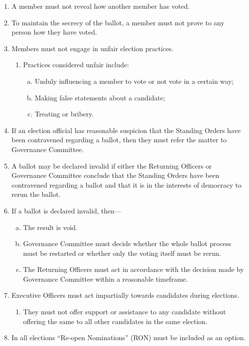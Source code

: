 \documentclass[12pt]{article}
\begin{document}
\begin{enumerate}
\begin{enumerate}
    \end{enumerate}
    \item A member must not reveal how another member has voted.
    \item To maintain the secrecy of the ballot, a member must not prove to any person how they have voted.
    \item Members must not engage in unfair election practices.
    \begin{enumerate}
        \item Practices considered unfair include:
        \begin{enumerate}[(a)]
            \item Unduly influencing a member to vote or not vote in a certain way;
            \item Making false statements about a candidate;
            \item Treating or bribery.
        \end{enumerate}
    \end{enumerate}
    \item If an election official has reasonable suspicion that the Standing Orders have been contravened regarding a ballot, then they must refer the matter to Governance Committee.
    \item A ballot may be declared invalid if either the Returning Officers or Governance Committee conclude that the Standing Orders have been contravened regarding a ballot and that it is in the interests of democracy to rerun the ballot.
    \item If a ballot is declared invalid, then—
    \begin{enumerate}[(a)]
        \item The result is void.
        \item Governance Committee must decide whether the whole ballot process must be restarted or whether only the voting itself must be rerun.
        \item The Returning Officers must act in accordance with the decision made by Governance Committee within a reasonable timeframe.
    \end{enumerate}
    \item Executive Officers must act impartially towards candidates during elections.
    \begin{enumerate}
        \item They must not offer support or assistance to any candidate without offering the same to all other candidates in the same election.
    \end{enumerate}
    \item In all elections ``Re-open Nominations'' (RON) must be included as an option.
\end{enumerate}
\newpage
\end{document}
